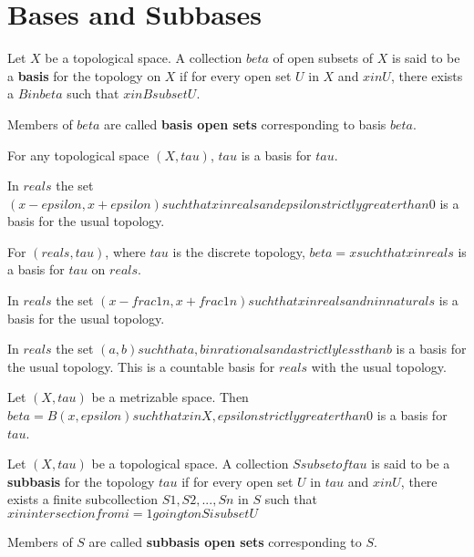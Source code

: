 \section{Bases and Subbases}

\begin{defn}
    Let $X$ be a topological space. A collection $beta$ of open subsets of $X$ is said to be a \textbf{basis} for the topology on $X$ if for every open set $U$ in $X$ and $x in U$, there exists a $B in beta$ such that $x in B subset U$.

    Members of $beta$ are called \textbf{basis open sets} corresponding to basis $beta$.
\end{defn}

\begin{note}
    For any topological space $(X, tau)$, $tau$ is a basis for $tau$.
\end{note}

\begin{note}
    In $reals$ the set ${{ (x - epsilon, x + epsilon) such that x in reals and epsilon strictly greater than 0 }}$ is a basis for the usual topology.
\end{note}

\begin{note}
    For $(reals, tau)$, where $tau$ is the discrete topology, $beta = {{ {{ x }} such that x in reals }}$ is a basis for $tau$ on $reals$.
\end{note}

\begin{note}
    In $reals$ the set ${{ (x - frac{1}{n}, x + frac{1}{n}) such that x in reals and n in naturals }}$ is a basis for the usual topology.
\end{note}

\begin{note}
    In $reals$ the set ${{ (a, b) such that a,b in rationals and a strictly less than b }}$ is a basis for the usual topology. This is a countable basis for $reals$ with the usual topology.
\end{note}

\begin{note}
    Let $(X, tau)$ be a metrizable space. Then $beta = {{ B(x, epsilon) such that x in X, epsilon strictly greater than 0 }}$ is a basis for $tau$.
\end{note}

\begin{defn}
    Let $(X, tau)$ be a topological space. A collection $S subset of tau$ is said to be a \textbf{subbasis} for the topology $tau$ if for every open set $U$ in $tau$ and $x in U$, there exists a finite subcollection ${{ S1, S2, ..., Sn }}$ in $S$ such that $x in intersection from {i = 1} going to n Si subset U$

    Members of $S$ are called \textbf{subbasis open sets} corresponding to $S$.
\end{defn}

